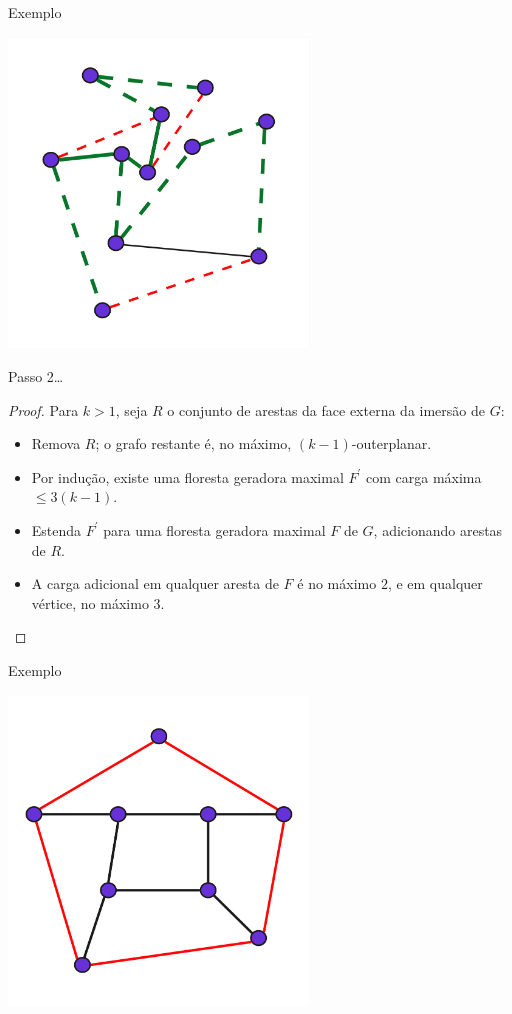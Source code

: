 \begin{frame}{Exemplo}
    \begin{minipage}{\linewidth}
        \centering
        \includegraphics[width=8cm]{images/proof_2_3.jpg}
    \end{minipage}
\end{frame}

\begin{frame}{Passo 2\dots}
    \begin{proof}
        Para $k > 1$, seja $R$ o conjunto de arestas da face externa da imersão de $G$:
        \begin{itemize}[-]
            \item Remova $R$; o grafo restante é, no máximo, $(k - 1)$-outerplanar.
            \item Por indução, existe uma floresta geradora maximal $F^{\prime}$ com carga máxima $\leq 3(k - 1)$.
            \item Estenda $F^{\prime}$ para uma floresta geradora maximal $F$ de $G$, adicionando arestas de $R$.
            \item A carga adicional em qualquer aresta de $F$ é no máximo $2$, e em qualquer vértice, no máximo $3$.
        \end{itemize}
    \end{proof}
\end{frame}

\begin{frame}{Exemplo}
    \begin{minipage}{\linewidth}
        \centering
        \includegraphics[width=8cm]{images/proof_2_4.jpg}
    \end{minipage}
\end{frame}

